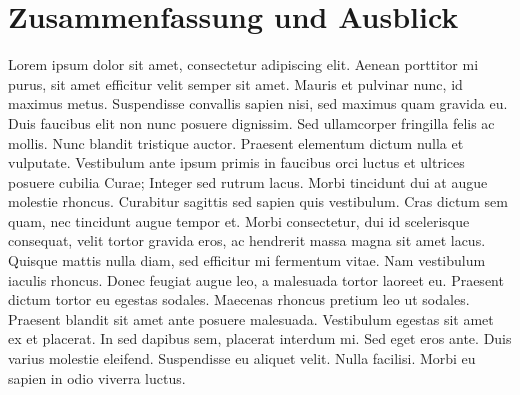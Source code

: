 
\chapter{Zusammenfassung und Ausblick}

Lorem ipsum dolor sit amet, consectetur adipiscing elit. Aenean porttitor mi purus, sit amet efficitur velit semper sit amet. Mauris et pulvinar nunc, id maximus metus. Suspendisse convallis sapien nisi, sed maximus quam gravida eu. Duis faucibus elit non nunc posuere dignissim. Sed ullamcorper fringilla felis ac mollis. Nunc blandit tristique auctor. Praesent elementum dictum nulla et vulputate. Vestibulum ante ipsum primis in faucibus orci luctus et ultrices posuere cubilia Curae; Integer sed rutrum lacus. Morbi tincidunt dui at augue molestie rhoncus. Curabitur sagittis sed sapien quis vestibulum. Cras dictum sem quam, nec tincidunt augue tempor et. Morbi consectetur, dui id scelerisque consequat, velit tortor gravida eros, ac hendrerit massa magna sit amet lacus. Quisque mattis nulla diam, sed efficitur mi fermentum vitae. Nam vestibulum iaculis rhoncus.\newpar
Donec feugiat augue leo, a malesuada tortor laoreet eu. Praesent dictum tortor eu egestas sodales. Maecenas rhoncus pretium leo ut sodales. Praesent blandit sit amet ante posuere malesuada. Vestibulum egestas sit amet ex et placerat. In sed dapibus sem, placerat interdum mi. Sed eget eros ante. Duis varius molestie eleifend. Suspendisse eu aliquet velit. Nulla facilisi. Morbi eu sapien in odio viverra luctus.

\clearpage
